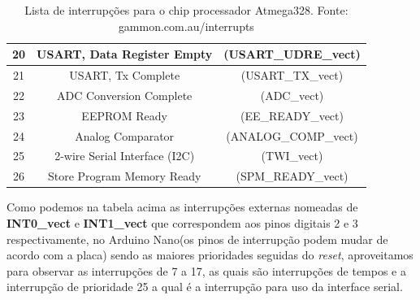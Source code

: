 \documentclass[a4paper,12pt,portuguese]{ufms-cpcx}
\begin{document}
\begin{table}[!h]
\begin{tabular}{|c|cc|}
		20 &           USART, Data Register Empty            &  (USART\_UDRE\_vect)  \\ \hline
		21 &               USART, Tx Complete                &   (USART\_TX\_vect)   \\ \hline
		22 &             ADC Conversion Complete             &     (ADC\_vect)      \\ \hline
		23 &                  EEPROM Ready                   &   (EE\_READY\_vect)   \\ \hline
		24 &                Analog Comparator                & (ANALOG\_COMP\_vect)  \\ \hline
		25 &         2-wire Serial Interface  (I2C)          &     (TWI\_vect)      \\ \hline
		26 &           Store Program Memory Ready            &  (SPM\_READY\_vect)   \\ \hline
	\end{tabular}
	\caption[Lista de interrupções]{Lista de interrupções para o chip processador Atmega328. Fonte: gammon.com.au/interrupts}
	\label{Tab:interrupcoes}
\end{table}

Como podemos na tabela acima as interrupções externas nomeadas de \textbf{INT0\_vect} e \textbf{INT1\_vect} que correspondem aos pinos digitais 2 e 3 respectivamente, no Arduino Nano(os pinos de interrupção podem mudar de acordo com a placa) sendo as maiores prioridades seguidas do \textit{reset}, aproveitamos para observar as interrupções de 7 a 17, as quais são interrupções de tempos e a interrupção de prioridade 25 a qual é a interrupção para uso da interface serial.
\end{document}
